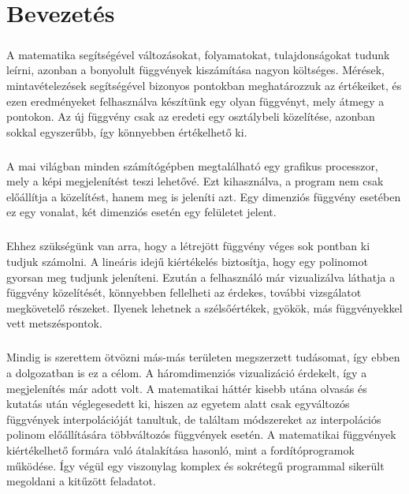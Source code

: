 \documentclass[12pt]{report}
\begin{document}
\tableofcontents

\chapter{Bevezetés}
\paragraph{}
A matematika segítségével változásokat, folyamatokat, tulajdonságokat tudunk leírni, azonban a bonyolult függvények kiszámítása nagyon költséges. Mérések, mintavételezések segítségével bizonyos pontokban meghatározzuk az értékeiket, és ezen eredményeket felhasználva készítünk egy olyan függvényt, mely átmegy a pontokon. Az új függvény csak az eredeti egy osztálybeli közelítése, azonban sokkal egyszerűbb, így könnyebben értékelhető ki.
\paragraph{}
A mai világban minden számítógépben megtalálható egy grafikus processzor, mely a képi megjelenítést teszi lehetővé. Ezt kihasználva, a program nem csak előállítja a közelítést, hanem meg is jeleníti azt. Egy dimenziós függvény esetében ez egy vonalat, két dimenziós esetén egy felületet jelent.
\paragraph{}
Ehhez szükségünk van arra, hogy a létrejött függvény véges sok pontban ki tudjuk számolni. A lineáris idejű kiértékelés biztosítja, hogy egy polinomot gyorsan meg tudjunk jeleníteni. Ezután a felhasználó már vizualizálva láthatja a függvény közelítését, könnyebben fellelheti az érdekes, további vizsgálatot megkövetelő részeket. Ilyenek lehetnek a szélsőértékek, gyökök, más függvényekkel vett metszéspontok.
\paragraph{}
Mindig is szerettem ötvözni más-más területen megszerzett tudásomat, így ebben a dolgozatban is ez a célom. A háromdimenziós vizualizáció érdekelt, így a megjelenítés már adott volt. A matematikai háttér kisebb utána olvasás és kutatás után véglegesedett ki, hiszen az egyetem alatt csak egyváltozós függvények interpolációját tanultuk, de találtam módszereket az interpolációs polinom előállítására többváltozós függvények esetén. A matematikai függvények kiértékelhető formára való átalakítása hasonló, mint a fordítóprogramok működése. Így végül egy viszonylag komplex és sokrétegű programmal sikerült megoldani a kitűzött feladatot.
\end{document}

